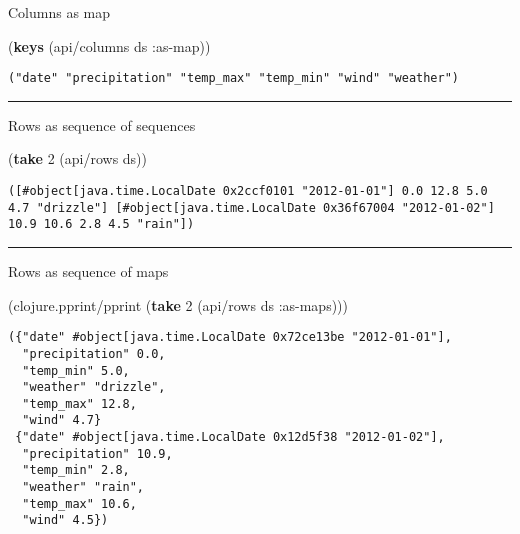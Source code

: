 \documentclass[]{article}
\newenvironment{Shaded}{\begin{snugshade}}{\end{snugshade}}
\newcommand{\KeywordTok}[1]{\textcolor[rgb]{0.13,0.29,0.53}{\textbf{#1}}}
\newcommand{\DecValTok}[1]{\textcolor[rgb]{0.00,0.00,0.81}{#1}}
\newcommand{\AttributeTok}[1]{\textcolor[rgb]{0.77,0.63,0.00}{#1}}
\newcommand{\NormalTok}[1]{#1}
\begin{document}
Columns as map

\begin{Shaded}
\begin{Highlighting}[]
\NormalTok{(}\KeywordTok{keys}\NormalTok{ (api/columns ds }\AttributeTok{:as-map}\NormalTok{))}
\end{Highlighting}
\end{Shaded}

\begin{verbatim}
("date" "precipitation" "temp_max" "temp_min" "wind" "weather")
\end{verbatim}

\begin{center}\rule{0.5\linewidth}{0.5pt}\end{center}

Rows as sequence of sequences

\begin{Shaded}
\begin{Highlighting}[]
\NormalTok{(}\KeywordTok{take} \DecValTok{2}\NormalTok{ (api/rows ds))}
\end{Highlighting}
\end{Shaded}

\begin{verbatim}
([#object[java.time.LocalDate 0x2ccf0101 "2012-01-01"] 0.0 12.8 5.0 4.7 "drizzle"] [#object[java.time.LocalDate 0x36f67004 "2012-01-02"] 10.9 10.6 2.8 4.5 "rain"])
\end{verbatim}

\begin{center}\rule{0.5\linewidth}{0.5pt}\end{center}

Rows as sequence of maps

\begin{Shaded}
\begin{Highlighting}[]
\NormalTok{(clojure.pprint/pprint (}\KeywordTok{take} \DecValTok{2}\NormalTok{ (api/rows ds }\AttributeTok{:as-maps}\NormalTok{)))}
\end{Highlighting}
\end{Shaded}

\begin{verbatim}
({"date" #object[java.time.LocalDate 0x72ce13be "2012-01-01"],
  "precipitation" 0.0,
  "temp_min" 5.0,
  "weather" "drizzle",
  "temp_max" 12.8,
  "wind" 4.7}
 {"date" #object[java.time.LocalDate 0x12d5f38 "2012-01-02"],
  "precipitation" 10.9,
  "temp_min" 2.8,
  "weather" "rain",
  "temp_max" 10.6,
  "wind" 4.5})
\end{verbatim}
\end{document}
